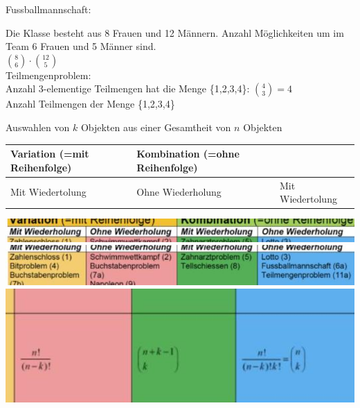 \documentclass[10pt]{article}
\begin{document}
Fussballmannschaft:

Die Klasse besteht aus 8 Frauen und 12 Männern. Anzahl Möglichkeiten um im Team 6 Frauen und 5 Männer sind.\\
$\binom{8}{6} \cdot\binom{12}{5}$\\
Teilmengenproblem:\\
Anzahl 3-elementige Teilmengen hat die Menge \{1,2,3,4\}: $\binom{4}{3}=4$\\
Anzahl Teilmengen der Menge \{1,2,3,4\}

Auswahlen von $k$ Objekten aus einer Gesamtheit von $n$ Objekten \begin{tabular}{lll}
Variation (=mit Reihenfolge) & Kombination (=ohne Reihenfolge) &  \\
\hline
Mit Wiedertolung & Ohne Wiederholung & Mit Wiedertolung \\
\hline
\end{tabular}

\includegraphics[width=\linewidth]{images/2024_12_29_0906b02acf849bda8665g-3(3)}\\
\includegraphics[width=\linewidth]{images/2024_12_29_0906b02acf849bda8665g-3(15)}\\
\includegraphics[width=\linewidth]{images/2024_12_29_0906b02acf849bda8665g-3(7)}
\end{document}
